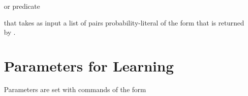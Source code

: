 \documentclass[letterpaper,10pt,english]{sphinxmanual}
\begin{document}
or predicate

\begin{sphinxVerbatim}[commandchars=\\\{\}]
  
\end{sphinxVerbatim}

that takes as input a list  of pairs probability-literal of the form that is returned by .


\section{Parameters for Learning}
\label{\detokenize{index:parameters-for-learning}}
Parameters are set with commands of the form

\begin{sphinxVerbatim}[commandchars=\\\{\}]
 
\end{sphinxVerbatim}
\end{document}
